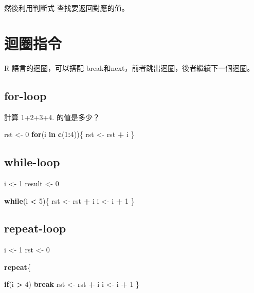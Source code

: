 \documentclass[]{book}
\newenvironment{Shaded}{\begin{snugshade}}{\end{snugshade}}
\newcommand{\ControlFlowTok}[1]{\textcolor[rgb]{0.13,0.29,0.53}{\textbf{#1}}}
\newcommand{\DecValTok}[1]{\textcolor[rgb]{0.00,0.00,0.81}{#1}}
\newcommand{\KeywordTok}[1]{\textcolor[rgb]{0.13,0.29,0.53}{\textbf{#1}}}
\newcommand{\NormalTok}[1]{#1}
\newcommand{\OperatorTok}[1]{\textcolor[rgb]{0.81,0.36,0.00}{\textbf{#1}}}
\newcommand{\StringTok}[1]{\textcolor[rgb]{0.31,0.60,0.02}{#1}}
\theoremstyle{definition}
\theoremstyle{definition}
\theoremstyle{definition}
\theoremstyle{remark}
\begin{document}
然後利用判斷式 查找要返回對應的值。

\section{迴圈指令}

R 語言的迴圈，可以搭配 break和next，前者跳出迴圈，後者繼續下一個迴圈。

\hypertarget{for-loop}{%
\subsection{for-loop}\label{for-loop}}

計算 1+2+3+4. 的值是多少？

\begin{Shaded}
\begin{Highlighting}[]
\NormalTok{rst <-}\StringTok{ }\DecValTok{0}
\ControlFlowTok{for}\NormalTok{(i }\ControlFlowTok{in} \KeywordTok{c}\NormalTok{(}\DecValTok{1}\OperatorTok{:}\DecValTok{4}\NormalTok{))\{ }
\NormalTok{  rst <-}\StringTok{ }\NormalTok{rst }\OperatorTok{+}\StringTok{ }\NormalTok{i}
\NormalTok{\}}
\end{Highlighting}
\end{Shaded}

\hypertarget{while-loop}{%
\subsection{while-loop}\label{while-loop}}

\begin{Shaded}
\begin{Highlighting}[]
\NormalTok{i <-}\StringTok{ }\DecValTok{1}
\NormalTok{result <-}\StringTok{ }\DecValTok{0}

\ControlFlowTok{while}\NormalTok{(i }\OperatorTok{<}\StringTok{ }\DecValTok{5}\NormalTok{)\{  }
\NormalTok{  rst <-}\StringTok{ }\NormalTok{rst }\OperatorTok{+}\StringTok{ }\NormalTok{i}
\NormalTok{  i <-}\StringTok{ }\NormalTok{i }\OperatorTok{+}\StringTok{ }\DecValTok{1}
\NormalTok{\}}
\end{Highlighting}
\end{Shaded}

\hypertarget{repeat-loop}{%
\subsection{repeat-loop}\label{repeat-loop}}

\begin{Shaded}
\begin{Highlighting}[]
\NormalTok{i <-}\StringTok{ }\DecValTok{1}
\NormalTok{rst <-}\StringTok{ }\DecValTok{0}

\ControlFlowTok{repeat}\NormalTok{\{  }
  
  \ControlFlowTok{if}\NormalTok{(i }\OperatorTok{>}\StringTok{ }\DecValTok{4}\NormalTok{) }\ControlFlowTok{break} 
\NormalTok{  rst <-}\StringTok{ }\NormalTok{rst }\OperatorTok{+}\StringTok{ }\NormalTok{i}
\NormalTok{  i <-}\StringTok{ }\NormalTok{i }\OperatorTok{+}\StringTok{ }\DecValTok{1}
\NormalTok{\}}
\end{Highlighting}
\end{Shaded}
\end{document}
